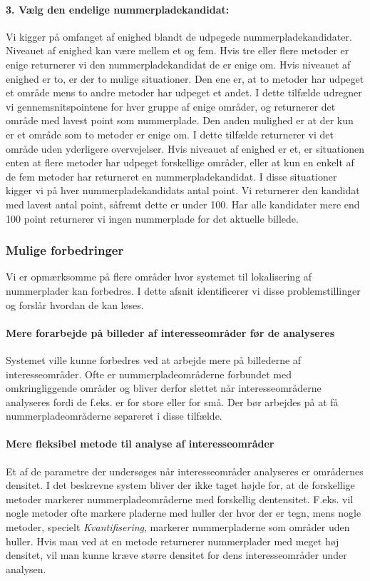 \paragraph{3. Vælg den endelige nummerpladekandidat:}
Vi kigger på omfanget af enighed blandt de udpegede nummerpladekandidater. Niveauet af enighed kan være mellem et og fem. Hvis tre eller flere metoder er enige returnerer vi den nummerpladekandidat de er enige om. Hvis niveauet af enighed er to, er der to mulige situationer. Den ene er, at to metoder har udpeget et område mens to andre metoder har udpeget et andet. I dette tilfælde udregner vi gennemsnitspointene for hver gruppe af enige områder, og returnerer det område med lavest point som nummerplade. Den anden mulighed er at der kun er et område som to metoder er enige om. I dette tilfælde returnerer vi det område uden yderligere overvejelser. Hvis niveauet af enighed er et, er situationen enten at flere metoder har udpeget forskellige områder, eller at kun en enkelt af de fem metoder har returneret en nummerpladekandidat. I disse situationer kigger vi på hver nummerpladekandidats antal point. Vi returnerer den kandidat med lavest antal point, såfremt dette er under 100. Har alle kandidater mere end 100 point returnerer vi ingen nummerplade for det aktuelle billede.

\subsubsection{Mulige forbedringer}
Vi er opmærksomme på flere områder hvor systemet til lokalisering af nummerplader kan forbedres. I dette afsnit identificerer vi disse problemstillinger og forslår hvordan de kan løses.

\paragraph{Mere forarbejde på billeder af interesseområder før de analyseres}
Systemet ville kunne forbedres ved at arbejde mere på billederne af interesseområder. Ofte er nummerpladeområderne forbundet med omkringliggende områder og bliver derfor slettet når interesseområderne analyseres fordi de f.eks. er for store eller for små. Der bør arbejdes på at få nummerpladeområderne separeret i disse tilfælde.

\paragraph{Mere fleksibel metode til analyse af interesseområder}
Et af de parametre der undersøges når interesseområder analyseres er områdernes densitet. I det beskrevne system bliver der ikke taget højde for, at de forskellige metoder markerer nummerpladeområderne med forskellig dentensitet. F.eks. vil nogle metoder ofte markere pladerne med huller der hvor der er tegn, mens nogle metoder, specielt \textit{Kvantifisering}, markerer nummerpladerne som områder uden huller. Hvis man ved at en metode returnerer nummerplader med meget høj densitet, vil man kunne kræve større densitet for dens interesseområder under analysen.


